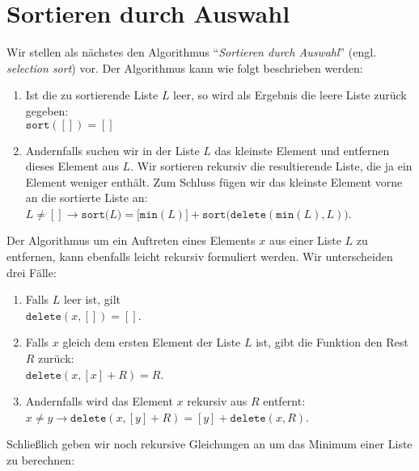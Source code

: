\section{Sortieren durch Auswahl}
Wir stellen als n\"achstes den Algorithmus ``\emph{Sortieren durch Auswahl}''
(engl. \emph{selection sort}) vor.  Der Algorithmus kann wie folgt beschrieben werden:
\begin{enumerate}
\item Ist die zu sortierende Liste $L$ leer, so wird als Ergebnis
      die leere Liste zur\"uck gegeben: \\[0.1cm]
      \hspace*{1.3cm} $\mathtt{sort}([]) = []$
\item Andernfalls suchen wir in der Liste $L$ das kleinste Element und entfernen dieses
      Element aus $L$.  Wir sortieren rekursiv die resultierende Liste, die ja ein Element
      weniger enth\"alt.  Zum Schluss f\"ugen wir das kleinste Element vorne an die sortierte
      Liste an: \\[0.1cm]
      \hspace*{1.3cm} 
      $L \not= [] \rightarrow \mathtt{sort}\bigl(L\bigr) = \bigl[\texttt{min}(L)\bigr]
      + \mathtt{sort}\bigl(\mathtt{delete}(\texttt{min}(L), L)\bigr)$.
\end{enumerate}
Der Algorithmus um ein Auftreten eines Elements $x$ aus einer Liste $L$ zu entfernen, kann ebenfalls leicht rekursiv
formuliert werden. Wir unterscheiden drei F\"alle:
\begin{enumerate}
\item Falls $L$ leer ist, gilt \\[0.1cm]
      \hspace*{1.3cm} $\mathtt{delete}(x, []) = []$.
\item Falls $x$ gleich dem ersten Element der Liste $L$ ist, gibt die Funktion den Rest
      $R$ zur\"uck: \\[0.1cm]
      \hspace*{1.3cm} 
      $\mathtt{delete}(x, [x] + R) = R$.
\item Andernfalls wird das Element $x$ rekursiv aus $R$ entfernt: \\[0.1cm]
      \hspace*{1.3cm}   
      $x \not = y \rightarrow \mathtt{delete}(x, [y] + R) = [y] + \mathtt{delete}(x,R)$.
\end{enumerate}
Schlie{\ss}lich geben wir noch rekursive Gleichungen an um das Minimum einer Liste zu berechnen:

